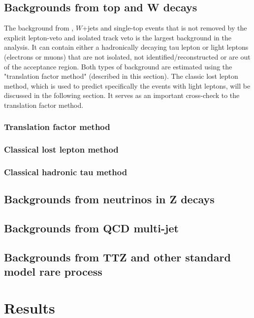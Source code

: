 \clearpage
\subsection{Backgrounds from top and W decays}
The background from \ttbar, $W$+jets and single-top events that is not removed by the explicit lepton-veto and isolated track veto is the largest background in the analysis. It can contain either a hadronically decaying tau lepton or light leptons (electrons or muons) that are not isolated, not identified/reconstructed or are out of the acceptance region. Both types of background are estimated using the "translation factor method" (described in this section). The classic lost lepton method, which is used to predict specifically the events with light leptons, will be discussed in the following section. It serves as an important cross-check to the translation factor method.

\clearpage
\subsubsection{Translation factor method}
\label{sec:c4bgtf}


\clearpage
\subsubsection{Classical lost lepton method}
\label{sec:c4bgll}


\clearpage
\subsubsection{Classical hadronic tau method}
\label{sec:c4bghadtau}


\clearpage
\subsection{Backgrounds from neutrinos in Z decays}
\label{sec:c4bgzinv}


\clearpage
\subsection{Backgrounds from QCD multi-jet}
\label{sec:c4bgqcd}


\clearpage
\subsection{Backgrounds from TTZ and other standard model rare process}
\label{sec:c4bgttzrare}


\clearpage
\section{Results}
\label{sec:c4results}

